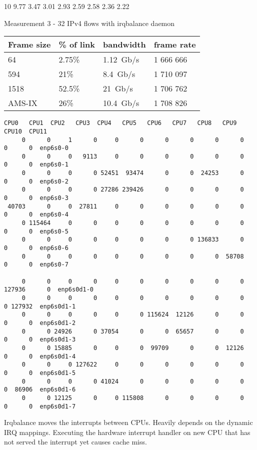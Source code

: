 10
  9.77%
   3.47%
   3.01%
   2.93%
   2.59%
   2.58%
   2.36%
   2.22%
   


\newpage
Measurement 3 - 32 IPv4 flows with irqbalance daemon

\begin{tabular}{ | l | l | l | l | }
\hline
Frame size & \% of link & bandwidth & frame rate \\
\hline
64     & 2.75\% & 1.12~Gb/s & 1 666 666 \\ %
594    & 21\%   & 8.4~Gb/s  & 1 710 097 \\ %
1518   & 52.5\% & 21~Gb/s   & 1 706 762 \\ %
AMS-IX & 26\%   & 10.4~Gb/s & 1 708 826 \\ %
\hline
\end{tabular}

\begin{lstlisting}[basicstyle=\tiny]
  CPU0   CPU1  CPU2   CPU3  CPU4   CPU5   CPU6   CPU7   CPU8   CPU9   CPU10  CPU11
     0      0     1      0     0      0      0      0      0      0      0      0  enp6s0-0
     0      0     0   9113     0      0      0      0      0      0      0      0  enp6s0-1
     0      0     0      0 52451  93474      0      0  24253      0      0      0  enp6s0-2
     0      0     0      0 27286 239426      0      0      0      0      0      0  enp6s0-3
 40703      0     0  27811     0      0      0      0      0      0      0      0  enp6s0-4
     0 115464     0      0     0      0      0      0      0      0      0      0  enp6s0-5
     0      0     0      0     0      0      0      0 136833      0      0      0  enp6s0-6
     0      0     0      0     0      0      0      0      0  58708      0      0  enp6s0-7

     0      0     0      0     0      0      0      0      0      0 127936      0  enp6s0d1-0
     0      0     0      0     0      0      0      0      0      0      0 127932  enp6s0d1-1
     0      0     0      0     0      0 115624  12126      0      0      0      0  enp6s0d1-2
     0      0 24926      0 37054      0      0  65657      0      0      0      0  enp6s0d1-3
     0      0 15885      0     0      0  99709      0      0  12126      0      0  enp6s0d1-4
     0      0     0 127622     0      0      0      0      0      0      0      0  enp6s0d1-5
     0      0     0      0 41024      0      0      0      0      0      0  86906  enp6s0d1-6
     0      0 12125      0     0 115808      0      0      0      0      0      0  enp6s0d1-7
\end{lstlisting}
Irqbalance moves the interrupts between CPUs.
Heavily depends on the dynamic IRQ mappings.
Executing the hardware interrupt handler on new CPU that has not served the interrupt yet causes cache miss.

